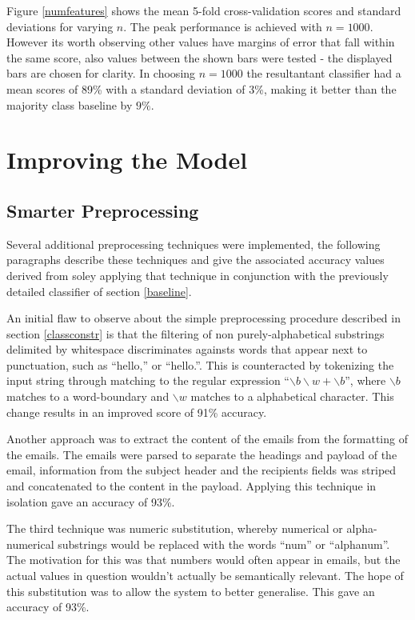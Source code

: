 \documentclass[12pt, a4paper]{article}
\begin{document}
  Figure \ref{numfeatures} shows the mean 5-fold cross-validation scores and standard deviations for varying $n$. The peak performance is achieved with $n = 1000$. However its worth observing other values have margins of error that fall within the same score, also values between the shown bars were tested - the displayed bars are chosen for clarity. In choosing $n = 1000$ the resultantant classifier had a mean scores of 89\% with a standard deviation of 3\%, making it better than the majority class baseline by $9\%$.

  \section{Improving the Model}

  \subsection{Smarter Preprocessing}

  Several additional preprocessing techniques were implemented, the following paragraphs describe these techniques and give the associated accuracy values derived from soley applying that technique in conjunction with the previously detailed classifier of section \ref{baseline}.

  An initial flaw to observe about the simple preprocessing procedure described in section \ref{classconstr} is that the filtering of non purely-alphabetical substrings delimited by whitespace discriminates againsts words that appear next to punctuation, such as ``hello,'' or ``hello.''. This is counteracted by tokenizing the input string through matching to the regular expression ``$\backslash b \backslash w+ \backslash b$'', where $\backslash b$ matches to a word-boundary and $\backslash w$ matches to a alphabetical character. This change results in an improved score of 91\% accuracy.

  Another approach was to extract the content of the emails from the formatting of the emails. The emails were parsed to separate the headings and payload of the email, information from the subject header and the recipients fields was striped and concatenated to the content in the payload. Applying this technique in isolation gave an accuracy of 93\%.

  The third technique was numeric substitution, whereby numerical or alpha-numerical substrings would be replaced with the words ``num'' or ``alphanum''. The motivation for this was that numbers would often appear in emails, but the actual values in question wouldn't actually be semantically relevant. The hope of this substitution was to allow the system to better generalise. This gave an accuracy of 93\%.
\end{document}
